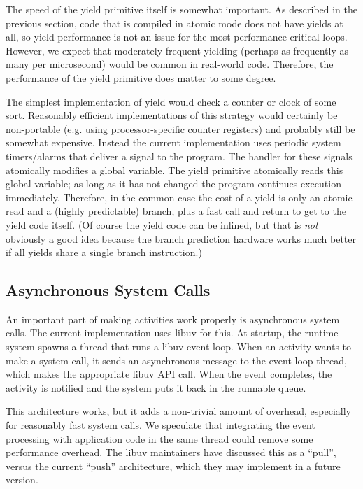 \documentclass[9pt,preprint]{sigplanconf}
\begin{document}
The speed of the yield primitive itself is somewhat important.
As described in the previous section, code that is compiled in atomic mode does not have yields at all, so yield performance is not an issue for the most performance critical loops.
However, we expect that moderately frequent yielding (perhaps as frequently as many per microsecond) would be common in real-world code.
Therefore, the performance of the yield primitive does matter to some degree.

The simplest implementation of yield would check a counter or clock of some sort.
Reasonably efficient implementations of this strategy would certainly be non-portable (e.g. using processor-specific counter registers) and probably still be somewhat expensive.
Instead the current \charcoal{} implementation uses periodic system timers/alarms that deliver a signal to the program.
The handler for these signals atomically modifies a global variable.
The yield primitive atomically reads this global variable; as long as it has not changed the program continues execution immediately.
Therefore, in the common case the cost of a yield is only an atomic read and a (highly predictable) branch, plus a fast call and return to get to the yield code itself.
(Of course the yield code can be inlined, but that is \emph{not} obviously a good idea because the branch prediction hardware works much better if all yields share a single branch instruction.)

\subsection{Asynchronous System Calls}

An important part of making activities work properly is asynchronous system calls.
The current \charcoal{} implementation uses libuv for this.
At startup, the runtime system spawns a thread that runs a libuv event loop.
When an activity wants to make a system call, it sends an asynchronous message to the event loop thread, which makes the appropriate libuv API call.
When the event completes, the activity is notified and the system puts it back in the runnable queue.

This architecture works, but it adds a non-trivial amount of overhead, especially for reasonably fast system calls.
We speculate that integrating the event processing with application code in the same thread could remove some performance overhead.
The libuv maintainers have discussed this as a ``pull'', versus the current ``push'' architecture, which they may implement in a future version.
\end{document}
